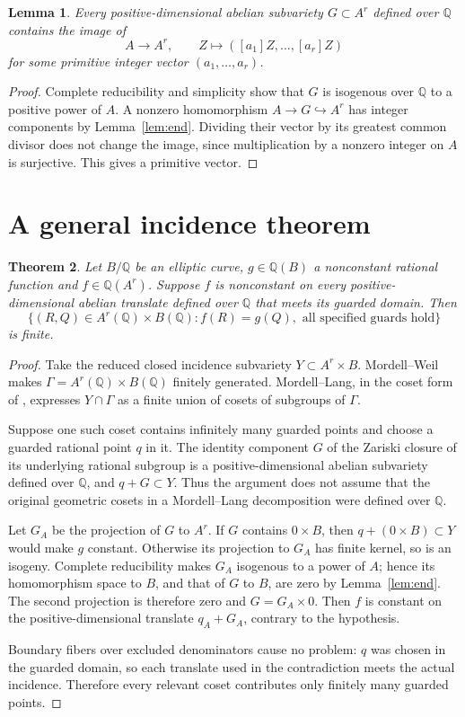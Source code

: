 \documentclass[11pt,a4paper]{article}
\newtheorem{theorem}{Theorem}[section]
\newtheorem{lemma}[theorem]{Lemma}
\newcommand{\Q}{\mathbb Q}\newcommand{\Z}{\mathbb Z}
\begin{document}
\begin{lemma}\label{lem:direction}
Every positive-dimensional abelian subvariety $G\subset A^r$
defined over $\Q$ contains the image of
\[
 A\longrightarrow A^r,\qquad
 Z\longmapsto([a_1]Z,\ldots,[a_r]Z)
\]
for some primitive integer vector $(a_1,\ldots,a_r)$.
\end{lemma}
\begin{proof}
Complete reducibility and simplicity show that $G$ is isogenous
over $\Q$ to a positive power of $A$. A nonzero homomorphism
$A\to G\hookrightarrow A^r$ has integer components by
Lemma~\ref{lem:end}. Dividing their vector by its greatest common
divisor does not change the image, since multiplication by a
nonzero integer on $A$ is surjective. This gives a primitive vector.
\end{proof}

\section{A general incidence theorem}

\begin{theorem}\label{thm:incidence}
Let $B/\Q$ be an elliptic curve, $g\in\Q(B)$ a nonconstant
rational function and $f\in\Q(A^r)$. Suppose $f$ is nonconstant
on every positive-dimensional abelian translate defined over $\Q$
that meets its guarded domain. Then
\[
 \{(R,Q)\in A^r(\Q)\times B(\Q): f(R)=g(Q),
                     \text{ all specified guards hold}\}
\]
is finite.
\end{theorem}
\begin{proof}
Take the reduced closed incidence subvariety $Y\subset A^r\times B$.
Mordell--Weil makes $\Gamma=A^r(\Q)\times B(\Q)$ finitely
generated. Mordell--Lang, in the coset form of
\cite[Theorem 1.1 and equation (1.1)]{GGK}, expresses $Y\cap\Gamma$
as a finite union of cosets of subgroups of $\Gamma$.

Suppose one such coset contains infinitely many guarded points and
choose a guarded rational point $q$ in it. The identity component
$G$ of the Zariski closure of its underlying rational subgroup is a
positive-dimensional abelian subvariety defined over $\Q$, and
$q+G\subset Y$. Thus the argument does not assume that the original
geometric cosets in a Mordell--Lang decomposition were defined over
$\Q$.

Let $G_A$ be the projection of $G$ to $A^r$. If $G$ contains
$0\times B$, then $q+(0\times B)\subset Y$ would make $g$
constant. Otherwise its projection to $G_A$ has finite kernel,
so is an isogeny. Complete reducibility makes $G_A$ isogenous
to a power of $A$; hence its homomorphism space to $B$, and that
of $G$ to $B$, are zero by Lemma~\ref{lem:end}. The second
projection is therefore zero and $G=G_A\times0$. Then $f$ is
constant on the positive-dimensional translate $q_A+G_A$,
contrary to the hypothesis.

Boundary fibers over excluded denominators cause no problem:
$q$ was chosen in the guarded domain, so each translate used in the
contradiction meets the actual incidence. Therefore every relevant
coset contributes only finitely many guarded points.
\end{proof}
\end{document}
